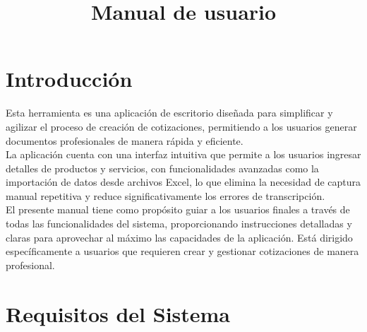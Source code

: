 \documentclass{Pretexto/bluereport}
\title{Manual de usuario}
\author{}
\date{}
\begin{document}



\tableofcontents
\pagebreak
\listoffigures
\pagebreak
\section{Introducción}
Esta herramienta es una aplicación de escritorio diseñada para simplificar y agilizar el proceso de creación de cotizaciones, 
permitiendo a los usuarios generar documentos profesionales de manera rápida y eficiente. \\
La aplicación cuenta con una interfaz intuitiva que permite a los usuarios ingresar detalles de productos y servicios, con funcionalidades
avanzadas como la importación de datos desde archivos Excel, lo que elimina la necesidad de captura manual repetitiva y reduce significativamente 
los errores de transcripción. \\
El presente manual tiene como propósito guiar a los usuarios finales a través de todas las funcionalidades del sistema, proporcionando instrucciones 
detalladas y claras para aprovechar al máximo las capacidades de la aplicación. Está dirigido específicamente a usuarios que requieren crear y gestionar 
cotizaciones de manera profesional.

\section{Requisitos del Sistema}
\end{document}

